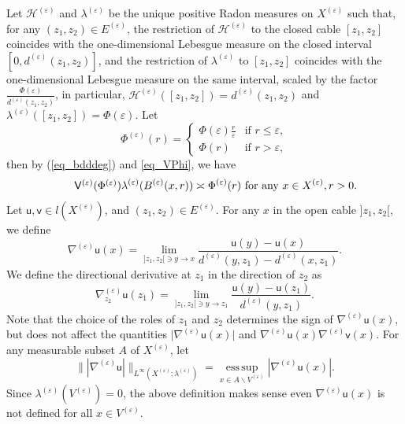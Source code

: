 \documentclass[11pt,a4paper]{article}
\numberwithin{equation}{section}
\newcommand{\esup}{\operatorname*{ess\,sup}}
\theoremstyle{plain}
\theoremstyle{definition}
\begin{document}
Let $\mathcal{H}^{(\varepsilon)}$ and $\lambda^{(\varepsilon)}$ be the unique positive Radon measures on $X^{(\varepsilon)}$ such that, for any $(z_1,z_2)\in E^{(\varepsilon)}$, the restriction of $\mathcal{H}^{(\varepsilon)}$ to the closed cable $[z_1,z_2]$ coincides with the one-dimensional Lebesgue measure on the closed interval $[0,d^{(\varepsilon)}(z_1,z_2)]$, and the restriction of $\lambda^{(\varepsilon)}$ to $[z_1,z_2]$ coincides with the one-dimensional Lebesgue measure on the same interval, scaled by the factor $\frac{\Phi(\varepsilon)}{d^{(\varepsilon)}(z_1,z_2)}$, in particular, $\mathcal{H}^{(\varepsilon)}([z_1,z_2])=d^{(\varepsilon)}(z_1,z_2)$ and $\lambda^{(\varepsilon)}([z_1,z_2])=\Phi(\varepsilon)$. Let
$$\Phi^{(\varepsilon)}(r)=
\begin{cases}
\Phi(\varepsilon)\frac{r}{\varepsilon}&\text{if }r\le\varepsilon,\\
\Phi(r)&\text{if }r>\varepsilon,
\end{cases}
$$
then by (\ref{eq_bdddeg}) and \ref{eq_VPhi}, we have
\begin{equation*}\label{eq_VPhieps}\tag*{$\mathsf{V}^{(\varepsilon)}(\Phi^{(\varepsilon)})$}
\lambda^{(\varepsilon)}(B^{(\varepsilon)}(x,r))\asymp \Phi^{(\varepsilon)}(r)\text{ for any }x\in X^{(\varepsilon)},r>0.
\end{equation*}
Let $\mathsf{u},\mathsf{v}\in l(X^{(\varepsilon)})$, and $(z_1,z_2)\in E^{(\varepsilon)}$. For any $x$ in the open cable $]z_1,z_2[$, we define
$$\nabla^{(\varepsilon)}\mathsf{u}(x)=\lim_{]z_1,z_2[\ni y\to x}\frac{\mathsf{u}(y)-\mathsf{u}(x)}{d^{(\varepsilon)}(y,z_1)-d^{(\varepsilon)}(x,z_1)}.$$
We define the directional derivative at $z_1$ in the direction of $z_2$ as
$$\nabla^{(\varepsilon)}_{z_2}\mathsf{u}(z_1)=\lim_{]z_1,z_2[\ni y\to z_1}\frac{\mathsf{u}(y)-\mathsf{u}(z_1)}{d^{(\varepsilon)}(y,z_1)}.$$
Note that the choice of the roles of $z_1$ and $z_2$ determines the sign of $\nabla^{(\varepsilon)}\mathsf{u}(x)$, but does not affect the quantities $\lvert\nabla^{(\varepsilon)}\mathsf{u}(x)\rvert$ and $\nabla^{(\varepsilon)}\mathsf{u}(x)\nabla^{(\varepsilon)}\mathsf{v}(x)$. For any measurable subset $A$ of $X^{(\varepsilon)}$, let
$$\lVert {|\nabla^{(\varepsilon)}\mathsf{u}|}\rVert_{L^\infty(X^{(\varepsilon)};\lambda^{(\varepsilon)})}=\esup_{x\in A\backslash V^{(\varepsilon)}}|\nabla^{(\varepsilon)}\mathsf{u}(x)|.$$
Since $\lambda^{(\varepsilon)}(V^{(\varepsilon)})=0$, the above definition makes sense even $\nabla^{(\varepsilon)}\mathsf{u}(x)$ is not defined for all $x\in V^{(\varepsilon)}$.
\end{document}
